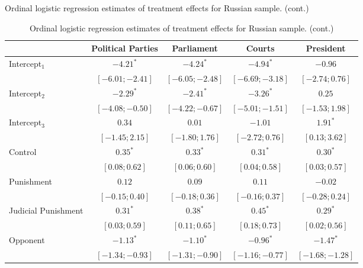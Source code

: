 \begin{table}[h]
\begin{center}
\caption
*
{Ordinal logistic regression estimates of treatment effects for Russian sample. (cont.)}
\caption{Ordinal logistic regression estimates of treatment effects for Russian sample. (cont.)}
\begin{threeparttable}
\begin{tabular}{l c c c c}
\hline
 & Political Parties & Parliament & Courts & President \\
\hline
Intercept$_1$            & $-4.21^{*}$       & $-4.24^{*}$       & $-4.94^{*}$       & $-0.96$           \\
                         & $ [-6.01; -2.41]$ & $ [-6.05; -2.48]$ & $ [-6.69; -3.18]$ & $ [-2.74;  0.76]$ \\
Intercept$_2$            & $-2.29^{*}$       & $-2.41^{*}$       & $-3.26^{*}$       & $0.25$            \\
                         & $ [-4.08; -0.50]$ & $ [-4.22; -0.67]$ & $ [-5.01; -1.51]$ & $ [-1.53;  1.98]$ \\
Intercept$_3$            & $0.34$            & $0.01$            & $-1.01$           & $1.91^{*}$        \\
                         & $ [-1.45;  2.15]$ & $ [-1.80;  1.76]$ & $ [-2.72;  0.76]$ & $ [ 0.13;  3.62]$ \\
Control                  & $0.35^{*}$        & $0.33^{*}$        & $0.31^{*}$        & $0.30^{*}$        \\
                         & $ [ 0.08;  0.62]$ & $ [ 0.06;  0.60]$ & $ [ 0.04;  0.58]$ & $ [ 0.03;  0.57]$ \\
Punishment               & $0.12$            & $0.09$            & $0.11$            & $-0.02$           \\
                         & $ [-0.15;  0.40]$ & $ [-0.18;  0.36]$ & $ [-0.16;  0.37]$ & $ [-0.28;  0.24]$ \\
Judicial Punishment      & $0.31^{*}$        & $0.38^{*}$        & $0.45^{*}$        & $0.29^{*}$        \\
                         & $ [ 0.03;  0.59]$ & $ [ 0.11;  0.65]$ & $ [ 0.18;  0.73]$ & $ [ 0.02;  0.56]$ \\
Opponent                 & $-1.13^{*}$       & $-1.10^{*}$       & $-0.96^{*}$       & $-1.47^{*}$       \\
                         & $ [-1.34; -0.93]$ & $ [-1.31; -0.90]$ & $ [-1.16; -0.77]$ & $ [-1.68; -1.28]$ \\

\end{tabular}
\end{threeparttable}
\end{center}
\end{table}
